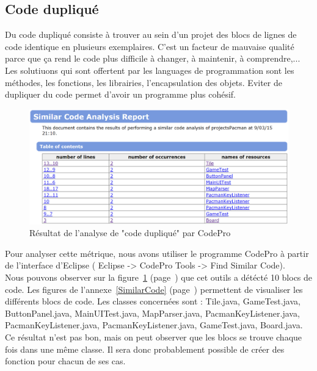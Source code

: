 \documentclass[12pt,a4paper,final]{article}
\newcommand{\annexe}[1]{annexe~\ref{#1} (page~\pageref{#1})}
\newcommand{\labelfigure}[1]{figure~\ref{#1} (page~\pageref{#1})}
\begin{document}
\subsection{Code dupliqué}\label{codeduplique}
Du code dupliqué consiste à trouver au sein d'un projet des blocs de lignes de code identique en plusieurs exemplaires.
C'est un facteur de mauvaise qualité parce que ça rend le code plus difficile à changer, à maintenir, à comprendre,...\\
Les solutiuons qui sont offertent par les languages de programmation sont les méthodes, les fonctions, les librairies, l'encapsulation des objets. Eviter de dupliquer du code permet d'avoir un programme plus cohésif.
\begin{figure}[!h]
	\centering
	\includegraphics[width=\textwidth]{SimilarCode_00.png}
	\caption{\label{SimilarCode0}Résultat de l'analyse de "code dupliqué" par CodePro}
\end{figure}
Pour analyser cette métrique, nous avons utiliser le programme CodePro à partir de l'interface d'Eclipse ( Eclipse -> CodePro Tools -> Find Similar Code).\\
Nous pouvons observer sur la \labelfigure{SimilarCode0} que cet outils a détécté 10 blocs de code. Les figures de l'\annexe{SimilarCode} permettent de visualiser les différents blocs de code.
Les classes concernées sont : Tile.java, GameTest.java, ButtonPanel.java, MainUITest.java, MapParser.java, PacmanKeyListener.java, PacmanKeyListener.java, PacmanKeyListener.java,  GameTest.java, Board.java.\\
Ce résultat n'est pas bon, mais on peut observer que les blocs se trouve chaque fois dans une même classe. Il sera donc probablement possible de créer des fonction pour chacun de ses cas.

\end{document}
